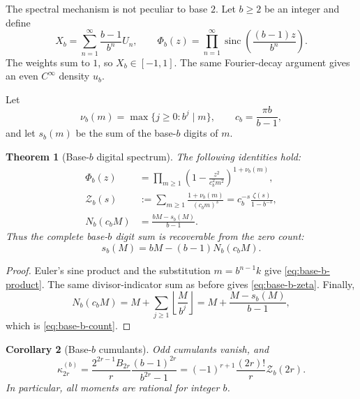 \documentclass[11pt,oneside]{article}
\newtheorem{theorem}{Theorem}[section]
\newtheorem{corollary}[theorem]{Corollary}
\theoremstyle{definition}
\theoremstyle{remark}
\newcommand{\sinc}{\operatorname{sinc}}
\begin{document}
The spectral mechanism is not peculiar to base \(2\).  Let \(b\geq2\) be an
integer and define
\begin{equation}
 X_b=\sum_{n=1}^{\infty}\frac{b-1}{b^n}U_n,
 \qquad
 \Phi_b(z)=
 \prod_{n=1}^{\infty}
 \sinc\!\left(\frac{(b-1)z}{b^n}\right).
 \label{eq:base-b}
\end{equation}
The weights sum to \(1\), so \(X_b\in[-1,1]\).  The same Fourier-decay
argument gives an even \(C^\infty\) density \(u_b\).

Let
\[
 \nu_b(m)=\max\{j\geq0:b^j\mid m\},\qquad
 c_b=\frac{\pi b}{b-1},
\]
and let \(s_b(m)\) be the sum of the base-\(b\) digits of \(m\).

\begin{theorem}[Base-\(b\) digital spectrum]
\label{thm:base-b-spectrum}
The following identities hold:
\begin{align}
 \Phi_b(z)
 &=
 \prod_{m\geq1}
 \left(1-\frac{z^2}{c_b^2m^2}\right)^{1+\nu_b(m)},
 \label{eq:base-b-product}\\
 \mathcal Z_b(s)
 &:=
 \sum_{m\geq1}\frac{1+\nu_b(m)}{(c_bm)^s}
 =
 c_b^{-s}\frac{\zeta(s)}{1-b^{-s}},
 \label{eq:base-b-zeta}\\
 N_b(c_bM)
 &=
 \frac{bM-s_b(M)}{b-1}.
 \label{eq:base-b-count}
\end{align}
Thus the complete base-\(b\) digit sum is recoverable from the zero count:
\begin{equation}
 s_b(M)=bM-(b-1)N_b(c_bM).
 \label{eq:digit-recovery}
\end{equation}
\end{theorem}

\begin{proof}
Euler's sine product and the substitution \(m=b^{n-1}k\) give
\eqref{eq:base-b-product}.  The same divisor-indicator sum as before gives
\eqref{eq:base-b-zeta}.  Finally,
\[
 N_b(c_bM)
 =M+\sum_{j\geq1}\left\lfloor\frac M{b^j}\right\rfloor
 =M+\frac{M-s_b(M)}{b-1},
\]
which is \eqref{eq:base-b-count}.
\end{proof}

\begin{corollary}[Base-\(b\) cumulants]
Odd cumulants vanish, and
\begin{equation}
 \kappa_{2r}^{(b)}
 =
 \frac{2^{2r-1}B_{2r}}r
 \frac{(b-1)^{2r}}{b^{2r}-1}
 =
 (-1)^{r+1}\frac{(2r)!}{r}\mathcal Z_b(2r).
 \label{eq:base-b-cumulants}
\end{equation}
In particular, all moments are rational for integer \(b\).
\end{corollary}
\end{document}

